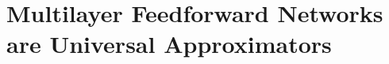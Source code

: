 \documentclass{book}
\begin{document}
    
\section{Multilayer Feedforward Networks are Universal Approximators}

    
\end{document}
